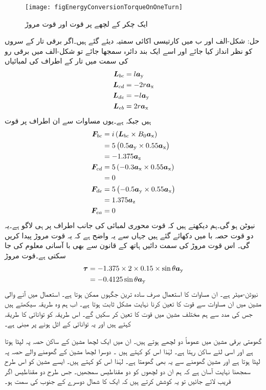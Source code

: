 %
\begin{figure}
\centering
\texttt{[image: figEnergyConversionTorqueOnOneTurn]}
\caption{ایک چکر کے لچھے پر قوت اور قوت مروڑ}
\label{شکل_تبادلہ_طاقت_لچھے_پر_قوت_اور_مروڑ}
\end{figure}
%
حل:
	شکل-الف اور ب میں کارتیسی اکائی سمتیہ دیئے گئے ہیں۔اگر برقی تار کے سروں کو نظر انداز کیا جائے اور اسے ایک بند دائرہ سمجھا جائے تو  شکل-الف میں  برقی رو کی سمت میں تار کے اطراف کی لمبائیاں 
\begin{align*}
{\ensuremath{{\boldsymbol{L}}}}_{bc}&=l {\boldsymbol{a}}_{\textup{y}}\\
{{\boldsymbol{L}}}_{cd}&=-2 r {\boldsymbol{a}}_{\textup{x}}\\
{{\boldsymbol{L}}}_{de}&=-l {\boldsymbol{a}}_{\textup{y}}\\
{{\boldsymbol{L}}}_{eb}&=2 r {\boldsymbol{a}}_{\textup{x}}
\end{align*}
ہیں جبکہ  ہے۔یوں مساوات   سے ان اطراف پر قوت
\begin{align*}
{\ensuremath{{\boldsymbol{F}}}}_{bc}&= i \left({{\boldsymbol{L}}}_{bc} \times B_0 {\boldsymbol{a}}_{\textup{x}} \right)\\
&=5 \left(0.5 {\boldsymbol{a}}_{\textup{y}} \times 0.55 {\boldsymbol{a}}_{\textup{x}} \right)\\
&=-1.375 {\boldsymbol{a}}_{\textup{z}}\\
{{\boldsymbol{F}}}_{cd}&= 5\left(-0.3{\boldsymbol{a}}_{\textup{x}} \times 0.55 {\boldsymbol{a}}_{\textup{x}} \right)\\
&=0\\
{{\boldsymbol{F}}}_{de}&= 5 \left(-0.5{\boldsymbol{a}}_{\textup{y}} \times 0.55 {\boldsymbol{a}}_{\textup{x}} \right)\\
&=1.375 {\boldsymbol{a}}_{\textup{z}}\\
{{\boldsymbol{F}}}_{ea}&= 0
\end{align*}
نیوٹن ہو گی۔ہم دیکھتے ہیں کہ قوت محوری لمبائی کی جانب اطراف پر ہی لاگو  ہے۔یہ دو قوت حصہ با میں دکھائے گئے ہیں جہاں سے یہ واضح ہے کہ یہ قوت مروڑ پیدا کریں گی۔ اس قوت مروڑ کی سمت دائیں ہاتھ کے قانون سے بھی با آسانی معلوم کی جا سکتی ہے۔قوت مروڑ
\begin{align*}
{\ensuremath{{\boldsymbol{\tau}}}}&=-1.375 \times 2 \times 0.15 \times \sin \theta {\boldsymbol{a}}_{\textup{y}}\\
&=-0.4125 \sin \theta {\boldsymbol{a}}_{\textup{y}}
\end{align*}
نیوٹن-میٹر ہے۔
%
	 ان مساوات کا استعمال صرف سادہ ترین جگہوں ممکن ہوتا ہے۔ استعمال میں آنے والی مشین میں ان مساوات سے قوت کا تعین کرنا نہایت مشکل ثابت ہوتا ہے۔ اب ہم وہ طریقہ سیکھتے ہیں جس کی مدد سے ہم مختلف مشین میں قوت کا تعین کر سکیں گے۔ اس طریقہ کو توانائی کا طریقہ کہتے ہیں اور یہ توانائی کے اٹل ہونے پر مبنی ہے۔

گھومتی برقی مشین میں عموماً دو لچھے ہوتے ہیں۔ ان میں ایک لچھا  مشین کے ساکن حصہ پہ لپٹا ہوتا ہے اور اسی لئے ساکن رہتا ہے۔ لہٰذا  اس کو    کہتے ہیں ۔  دوسرا لچھا  مشین کے گھومنے والے حصہ پہ لپٹا ہوتا ہے اور مشین گھومنے سے یہ بھی گھومتا ہے۔ لہٰذا اس کو   کہتے ہیں۔  ایسے مشین  کو اس طرح سمجھنا نہایت آسان ہے کہ ہم ان دو لچھوں کو دو مقناطیس سمجھیں۔ جس طرح دو مقناطیس اگر قریب لائے جائیں تو یہ کوشش کرتے ہیں کہ ایک کا شمال  دوسرے کے جنوب  کی سمت  ہو۔

